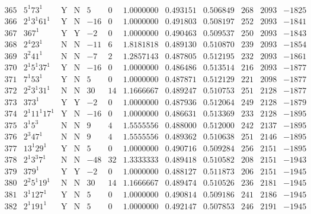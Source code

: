 \documentclass[11pt,reqno,a4letter]{article}
\numberwithin{figure}{section}
\numberwithin{table}{section}
\theoremstyle{plain}
\numberwithin{theorem}{section}
\theoremstyle{definition}
\begin{document}
\begin{table}[ht]
\begin{equation*}
{\begin{array}{cc|cc|ccc|cc|ccc}
 365 & 5^1 73^1 & \text{Y} & \text{N} & 5 & 0 & 1.0000000 & 0.493151 & 0.506849 & 268 & 2093 & -1825 \\
 366 & 2^1 3^1 61^1 & \text{Y} & \text{N} & -16 & 0 & 1.0000000 & 0.491803 & 0.508197 & 252 & 2093 & -1841 \\
 367 & 367^1 & \text{Y} & \text{Y} & -2 & 0 & 1.0000000 & 0.490463 & 0.509537 & 250 & 2093 & -1843 \\
 368 & 2^4 23^1 & \text{N} & \text{N} & -11 & 6 & 1.8181818 & 0.489130 & 0.510870 & 239 & 2093 & -1854 \\
 369 & 3^2 41^1 & \text{N} & \text{N} & -7 & 2 & 1.2857143 & 0.487805 & 0.512195 & 232 & 2093 & -1861 \\
 370 & 2^1 5^1 37^1 & \text{Y} & \text{N} & -16 & 0 & 1.0000000 & 0.486486 & 0.513514 & 216 & 2093 & -1877 \\
 371 & 7^1 53^1 & \text{Y} & \text{N} & 5 & 0 & 1.0000000 & 0.487871 & 0.512129 & 221 & 2098 & -1877 \\
 372 & 2^2 3^1 31^1 & \text{N} & \text{N} & 30 & 14 & 1.1666667 & 0.489247 & 0.510753 & 251 & 2128 & -1877 \\
 373 & 373^1 & \text{Y} & \text{Y} & -2 & 0 & 1.0000000 & 0.487936 & 0.512064 & 249 & 2128 & -1879 \\
 374 & 2^1 11^1 17^1 & \text{Y} & \text{N} & -16 & 0 & 1.0000000 & 0.486631 & 0.513369 & 233 & 2128 & -1895 \\
 375 & 3^1 5^3 & \text{N} & \text{N} & 9 & 4 & 1.5555556 & 0.488000 & 0.512000 & 242 & 2137 & -1895 \\
 376 & 2^3 47^1 & \text{N} & \text{N} & 9 & 4 & 1.5555556 & 0.489362 & 0.510638 & 251 & 2146 & -1895 \\
 377 & 13^1 29^1 & \text{Y} & \text{N} & 5 & 0 & 1.0000000 & 0.490716 & 0.509284 & 256 & 2151 & -1895 \\
 378 & 2^1 3^3 7^1 & \text{N} & \text{N} & -48 & 32 & 1.3333333 & 0.489418 & 0.510582 & 208 & 2151 & -1943 \\
 379 & 379^1 & \text{Y} & \text{Y} & -2 & 0 & 1.0000000 & 0.488127 & 0.511873 & 206 & 2151 & -1945 \\
 380 & 2^2 5^1 19^1 & \text{N} & \text{N} & 30 & 14 & 1.1666667 & 0.489474 & 0.510526 & 236 & 2181 & -1945 \\
 381 & 3^1 127^1 & \text{Y} & \text{N} & 5 & 0 & 1.0000000 & 0.490814 & 0.509186 & 241 & 2186 & -1945 \\
 382 & 2^1 191^1 & \text{Y} & \text{N} & 5 & 0 & 1.0000000 & 0.492147 & 0.507853 & 246 & 2191 & -1945 \\

\end{array}}
\end{equation*}
\end{table}
\end{document}
